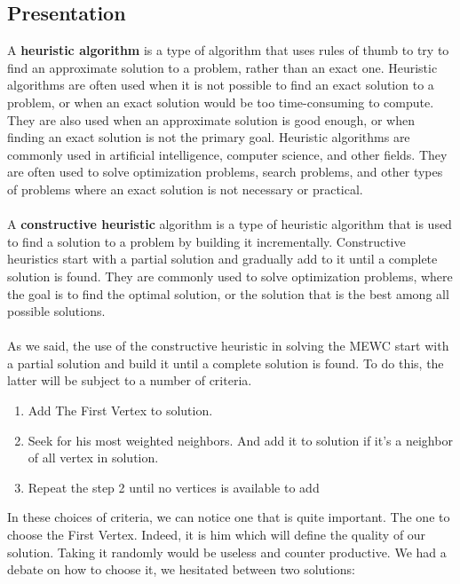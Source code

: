 
\subsection{Presentation}

    A \textbf{heuristic algorithm} is a type of algorithm that uses rules of thumb to try to find an approximate solution to a problem, rather than an exact one. Heuristic algorithms are often used when it is not possible to find an exact solution to a problem, or when an exact solution would be too time-consuming to compute. They are also used when an approximate solution is good enough, or when finding an exact solution is not the primary goal. Heuristic algorithms are commonly used in artificial intelligence, computer science, and other fields. They are often used to solve optimization problems, search problems, and other types of problems where an exact solution is not necessary or practical.
    \\ \\
    A \textbf{constructive heuristic} algorithm is a type of heuristic algorithm that is used to find a solution to a problem by building it incrementally. Constructive heuristics start with a partial solution and gradually add to it until a complete solution is found. They are commonly used to solve optimization problems, where the goal is to find the optimal solution, or the solution that is the best among all possible solutions.
    \\ \\
    As we said, the use of the constructive heuristic in solving the MEWC start with a partial solution and build it until a complete solution is found. To do this, the latter will be subject to a number of criteria. 

    \begin{enumerate}
        \item Add The First Vertex to solution.
        \item Seek for his most weighted neighbors. And add it to solution if it's a neighbor of all vertex in solution.
        \item Repeat the step 2 until no vertices is available to add
    \end{enumerate}

    In these choices of criteria, we can notice one that is quite important. The one to choose the First Vertex. Indeed, it is him which will define the quality of our solution. Taking it randomly would be useless and counter productive. We had a debate on how to choose it, we hesitated between two solutions:

